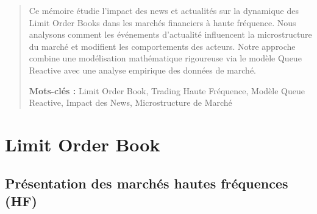 \documentclass[12pt,a4paper]{article}
\theoremstyle{definition}
\theoremstyle{remark}
\begin{document}
    \begin{abstract}
    \thispagestyle{empty}
    \vspace*{1cm}
    \begin{center}

    \end{center}
    \vspace{1cm}

    Ce mémoire étudie l'impact des news et actualités sur la dynamique des Limit Order Books dans les marchés financiers à haute fréquence. Nous analysons comment les événements d'actualité influencent la microstructure du marché et modifient les comportements des acteurs. Notre approche combine une modélisation mathématique rigoureuse via le modèle Queue Reactive avec une analyse empirique des données de marché.

    \vspace{1cm}
    \textbf{Mots-clés :} Limit Order Book, Trading Haute Fréquence, Modèle Queue Reactive, Impact des News, Microstructure de Marché

\end{abstract}
    \newpage
    \tableofcontents
    \thispagestyle{empty}

    \newpage
    \setcounter{page}{1}
    
    \section{Limit Order Book}

    \subsection{Présentation des marchés hautes fréquences (HF)}
\end{document}
